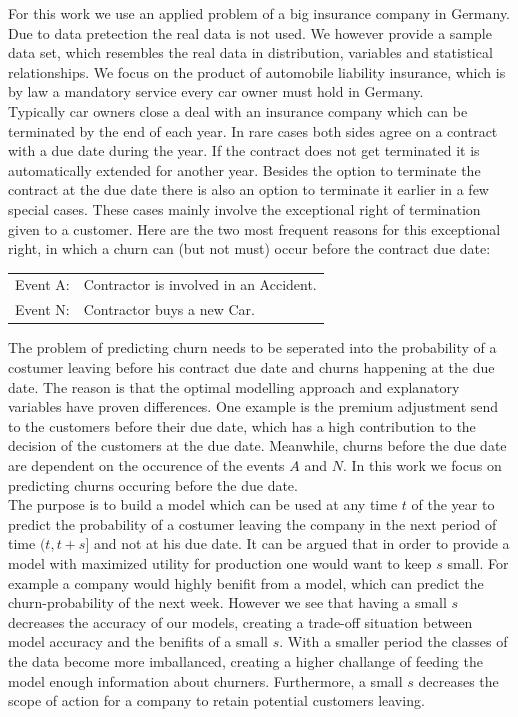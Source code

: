 \documentclass[12pt,titlepage]{article}
\begin{document}
For this work we use an applied problem of a big insurance company in Germany. Due to data pretection the real data is not used. We however provide a sample data set, which resembles the real data in distribution, variables and statistical relationships. We focus on the product of automobile liability insurance, which is by law a mandatory service every car owner must hold in Germany. \\
Typically car owners close a deal with an insurance company which can be terminated by the end of each year. In rare cases both sides agree on a contract with a due date during the year. If the contract does not get terminated it is automatically extended for another year. Besides the option to terminate the contract at the due date there is also an option to terminate it earlier in a few special cases. These cases mainly involve the exceptional right of termination given to a customer. Here are the two most frequent reasons for this exceptional right, in which a churn can (but not must) occur before the contract due date: \\

\noindent
\begin{center}
    \begin{tabular}{ll}
        Event A: & Contractor is involved in an Accident. \\
        Event N: & Contractor buys a new Car. \\
    \end{tabular}
\end{center}

\vspace{3mm}
\noindent
The problem of predicting churn needs to be seperated into the probability of a costumer leaving before his contract due date and churns happening at the due date. The reason is that the optimal modelling approach and explanatory variables have proven differences. One example is the premium adjustment send to the customers before their due date, which has a high contribution to the decision of the customers at the due date. Meanwhile, churns before the due date are dependent on the occurence of the events $A$ and $N$. In this work we focus on predicting churns occuring before the due date. \\

The purpose is to build a model which can be used at any time $t$ of the year to predict the probability of a costumer leaving the company in the next period of time $(t, t+s]$ and not at his due date. It can be argued that in order to provide a model with maximized utility for production one would want to keep $s$ small. For example a company would highly benifit from a model, which can predict the churn-probability of the next week. However we see that having a small $s$ decreases the accuracy of our models, creating a trade-off situation between model accuracy and the benifits of a small $s$. With a smaller period the classes of the data become more imballanced, creating a higher challange of feeding the model enough information about churners. Furthermore, a small $s$ decreases the scope of action for a company to retain potential customers leaving. \\
\end{document}
